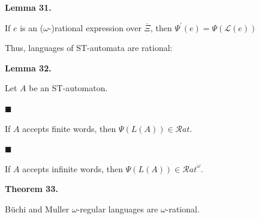  
 
\par\medskip\noindent\textbf{Lemma 31.}\par
 
 
If $e$ is an ($\omega$-)rational expression over $\overline{\Xi}$, then $\Psi^{\prime}(e)=\Psi(\mathcal{L}(e))$\par
 
 
 
 
Thus, languages of ST-automata are rational:\par
 
 
 
\par\medskip\noindent\textbf{Lemma 32.}\par
 
 
Let $A$ be an ST-automaton.\par
  
\par\noindent  $\blacksquare$ 
 
If $A$ accepts finite words, then $\Psi(L(A))\in\mathcal{R}at$.\par
 
 
 
\par\noindent  $\blacksquare$ 
 
If $A$ accepts infinite words, then $\Psi(L(A))\in{\mathcal{R}at}^{\omega}$.\par
 
 
  
 
 
 
\par\medskip\noindent\textbf{Theorem 33.}\par
 
 
Büchi and Muller $\omega$-regular languages are $\omega$-rational.\par
 
